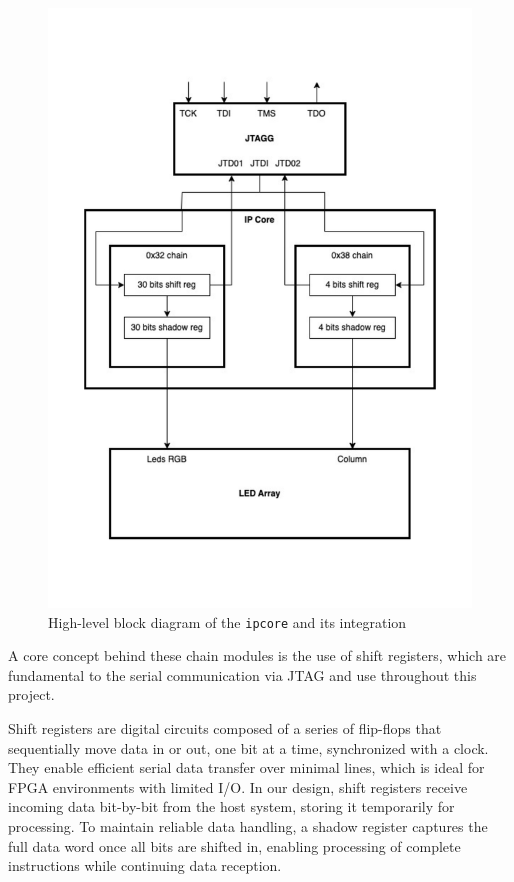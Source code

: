 \documentclass[a4paper,11pt,oneside]{report}
\begin{document}
\begin{figure}
    \centering
    \includegraphics[width=0.85\linewidth]{figures/IPCORE_Design.pdf}
    \caption{High-level block diagram of the \texttt{ipcore} and its integration}
    \label{fig:ipcore_block}
\end{figure}

A core concept behind these chain modules is the use of shift registers, which are fundamental to the serial communication via JTAG and use throughout this project.

Shift registers are digital circuits composed of a series of flip-flops that sequentially move data in or out, one bit at a time, synchronized with a clock.  
They enable efficient serial data transfer over minimal lines, which is ideal for FPGA environments with limited I/O.  
In our design, shift registers receive incoming data bit-by-bit from the host system, storing it temporarily for processing.  
To maintain reliable data handling, a shadow register captures the full data word once all bits are shifted in, enabling processing of complete instructions while continuing data reception.
  
\end{document}
